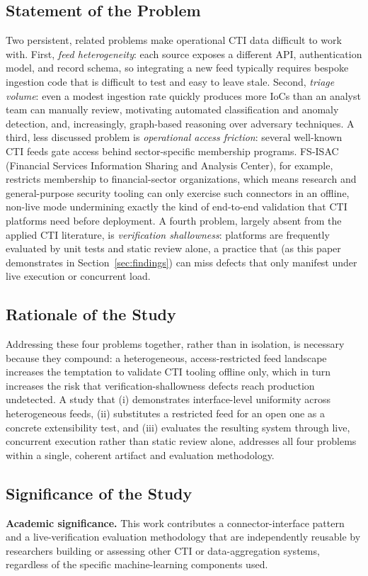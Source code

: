 \documentclass[conference]{IEEEtran}
\begin{document}
\subsection{Statement of the Problem}
Two persistent, related problems make operational CTI data difficult to work with. First, \emph{feed heterogeneity}: each source exposes a different API, authentication model, and record schema, so integrating a new feed typically requires bespoke ingestion code that is difficult to test and easy to leave stale. Second, \emph{triage volume}: even a modest ingestion rate quickly produces more IoCs than an analyst team can manually review, motivating automated classification and anomaly detection, and, increasingly, graph-based reasoning over adversary techniques. A third, less discussed problem is \emph{operational access friction}: several well-known CTI feeds gate access behind sector-specific membership programs. FS-ISAC (Financial Services Information Sharing and Analysis Center), for example, restricts membership to financial-sector organizations, which means research and general-purpose security tooling can only exercise such connectors in an offline, non-live mode \textemdash{} undermining exactly the kind of end-to-end validation that CTI platforms need before deployment. A fourth problem, largely absent from the applied CTI literature, is \emph{verification shallowness}: platforms are frequently evaluated by unit tests and static review alone, a practice that (as this paper demonstrates in Section~\ref{sec:findings}) can miss defects that only manifest under live execution or concurrent load.

\subsection{Rationale of the Study}
Addressing these four problems together, rather than in isolation, is necessary because they compound: a heterogeneous, access-restricted feed landscape increases the temptation to validate CTI tooling offline only, which in turn increases the risk that verification-shallowness defects reach production undetected. A study that (i) demonstrates interface-level uniformity across heterogeneous feeds, (ii) substitutes a restricted feed for an open one as a concrete extensibility test, and (iii) evaluates the resulting system through live, concurrent execution rather than static review alone, addresses all four problems within a single, coherent artifact and evaluation methodology.

\subsection{Significance of the Study}
\textbf{Academic significance.} This work contributes a connector-interface pattern and a live-verification evaluation methodology that are independently reusable by researchers building or assessing other CTI or data-aggregation systems, regardless of the specific machine-learning components used.
\end{document}
